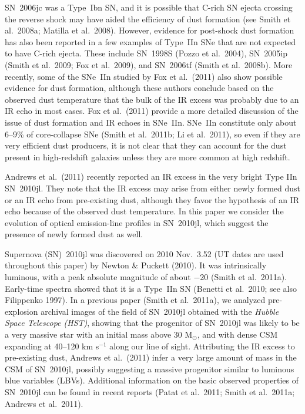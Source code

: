 \documentclass{emulateapj}
\begin{document}
SN~2006jc was a Type~Ibn SN, and it is possible that C-rich SN ejecta
crossing the reverse shock may have aided the efficiency of dust
formation (see Smith et al.\ 2008a; Matilla et al.\ 2008).  However,
evidence for post-shock dust formation has also been reported in a few
examples of Type~IIn SNe that are not expected to have C-rich ejecta.
These include SN~1998S (Pozzo et al.\ 2004), SN~2005ip (Smith et al.\
2009; Fox et al.\ 2009), and SN~2006tf (Smith et al.\ 2008b).  More
recently, some of the SNe~IIn studied by Fox et al.\ (2011) also show
possible evidence for dust formation, although these authors conclude
based on the observed dust temperature that the bulk of the IR excess was
probably due to an IR echo in most cases.  Fox et al.\ (2011) provide
a more detailed discussion of the issue of dust formation and IR
echoes in SNe~IIn.  SNe~IIn constitute only about 6--9\% of
core-collapse SNe (Smith et al.\ 2011b; Li et al.\ 2011), so even if
they are very efficient dust producers, it is not clear that they can
account for the dust present in high-redshift galaxies unless they are
more common at high redshift.


Andrews et al.\ (2011) recently reported an IR excess in the
very bright Type IIn SN~2010jl.  They note that the IR
excess may arise from either newly formed dust or an IR echo from
pre-existing dust, although they favor the hypothesis of an IR echo
because of the observed dust temperature.  In this paper we consider
the evolution of optical emission-line profiles in SN~2010jl, which
suggest the presence of newly formed dust as well.

Supernova (SN)~2010jl was discovered on 2010 Nov.\ 3.52 (UT dates are
used throughout this paper) by Newton \& Puckett (2010).  It
was intrinsically luminous, with a peak absolute magnitude of about
$-$20 (Smith et al.\ 2011a).  Early-time spectra showed that it is a
Type~IIn SN (Benetti et al.\ 2010; see also Filippenko 1997).  In a
previous paper (Smith et al.\ 2011a), we analyzed pre-explosion
archival images of the field of SN~2010jl obtained with the {\it
  Hubble Space Telescope (HST)}, showing that the progenitor of
SN~2010jl was likely to be a very massive star with an initial mass
above 30 M$_{\odot}$, and with dense CSM expanding at 40--120 km
s$^{-1}$ along our line of sight.  Attributing the IR excess to
pre-existing dust, Andrews et al.\ (2011) infer a very large amount of
mass in the CSM of SN~2010jl, possibly suggesting a massive progenitor
similar to luminous blue variables (LBVs).  Additional information on
the basic observed properties of SN~2010jl can be found in recent
reports (Patat et al.\ 2011; Smith et al.\ 2011a; Andrews et al.\
2011).
\end{document}
